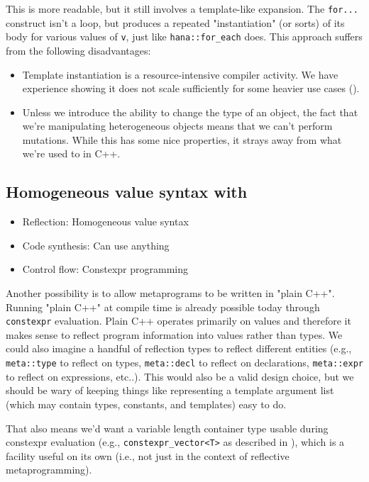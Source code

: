 \documentclass{wg21}
\newcommand{\cc}[1]{\texttt{#1}}
\begin{document}
This is more readable, but it still involves a template-like expansion. The
\cc{for...} construct isn't a loop, but produces a repeated "instantiation"
(or sorts) of its body for various values of \cc{v}, just like \cc{hana::for_each}
does. This approach suffers from the following disadvantages:

\begin{itemize}
  \item Template instantiation is a resource-intensive compiler activity. We
        have experience showing it does not scale sufficiently for some heavier
        use cases (\cite{Boost.Hana}).
  \item Unless we introduce the ability to change the type of an object, the
        fact that we're manipulating heterogeneous objects means that we can't
        perform mutations. While this has some nice properties, it strays away
        from what we're used to in C++.
\end{itemize}


\subsection{Homogeneous value syntax with \cite{P0598}}
\begin{itemize}
  \item Reflection: Homogeneous value syntax
  \item Code synthesis: Can use anything
  \item Control flow: Constexpr programming
\end{itemize}

Another possibility is to allow metaprograms to be written in "plain C++".
Running "plain C++" at compile time is already possible today through
\cc{constexpr} evaluation. Plain C++ operates primarily on values and
therefore it makes sense to reflect program information into values rather
than types. We could also imagine a handful of reflection types to reflect
different entities (e.g., \cc{meta::type} to reflect on types, \cc{meta::decl}
to reflect on declarations, \cc{meta::expr} to reflect on expressions, etc..).
This would also be a valid design choice, but we should be wary of keeping
things like representing a template argument list (which may contain types,
constants, and templates) easy to do.

That also means we'd want a variable length container type usable during
constexpr evaluation (e.g., \cc{constexpr_vector<T>} as described in
\cite{P0597}), which is a facility useful on its own (i.e., not just in
the context of reflective metaprogramming).
\end{document}
